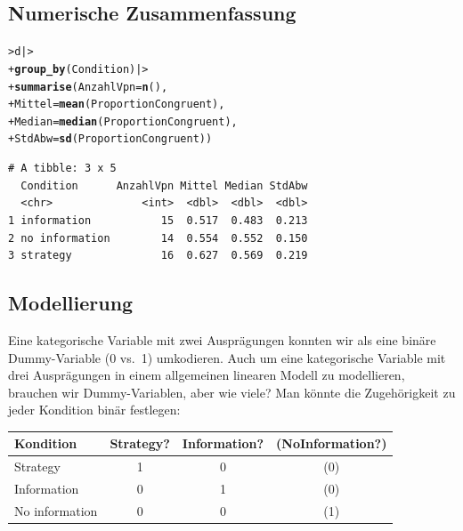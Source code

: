 \documentclass[oneside, 10pt]{book}\usepackage[]{graphicx}\usepackage[]{xcolor}
\makeatletter
\newcommand{\hlstd}[1]{\textcolor[rgb]{0.345,0.345,0.345}{#1}}%
\newcommand{\hlkwc}[1]{\textcolor[rgb]{0.333,0.667,0.333}{#1}}%
\newcommand{\hlkwd}[1]{\textcolor[rgb]{0.737,0.353,0.396}{\textbf{#1}}}%
\newenvironment{kframe}{%
 \def\at@end@of@kframe{}%
 \ifinner\ifhmode%
  \def\at@end@of@kframe{\end{minipage}}%
  \begin{minipage}{\columnwidth}%
 \fi\fi%
 \def\FrameCommand##1{\hskip\@totalleftmargin \hskip-\fboxsep
 \colorbox{shadecolor}{##1}\hskip-\fboxsep
     \hskip-\linewidth \hskip-\@totalleftmargin \hskip\columnwidth}%
 \MakeFramed {\advance\hsize-\width
   \@totalleftmargin\z@ \linewidth\hsize
   \@setminipage}}%
 {\par\unskip\endMakeFramed%
 \at@end@of@kframe}
\newenvironment{knitrout}{}{} %
\makeatother
\begin{document}
\subsection{Numerische Zusammenfassung}

\begin{knitrout}
\color{fgcolor}\begin{kframe}
\begin{alltt}
\hlstd{> }\hlstd{d |>}
\hlstd{+ }  \hlkwd{group_by}\hlstd{(Condition) |>}
\hlstd{+ }  \hlkwd{summarise}\hlstd{(}\hlkwc{AnzahlVpn} \hlstd{=} \hlkwd{n}\hlstd{(),}
\hlstd{+ }            \hlkwc{Mittel} \hlstd{=} \hlkwd{mean}\hlstd{(ProportionCongruent),}
\hlstd{+ }            \hlkwc{Median} \hlstd{=} \hlkwd{median}\hlstd{(ProportionCongruent),}
\hlstd{+ }            \hlkwc{StdAbw} \hlstd{=} \hlkwd{sd}\hlstd{(ProportionCongruent))}
\end{alltt}
\begin{verbatim}
# A tibble: 3 x 5
  Condition      AnzahlVpn Mittel Median StdAbw
  <chr>              <int>  <dbl>  <dbl>  <dbl>
1 information           15  0.517  0.483  0.213
2 no information        14  0.554  0.552  0.150
3 strategy              16  0.627  0.569  0.219
\end{verbatim}
\end{kframe}
\end{knitrout}

\subsection{Modellierung}
Eine kategorische Variable mit zwei Ausprägungen
konnten wir als eine binäre Dummy-Variable (0 vs.\ 1) umkodieren.
Auch um eine kategorische Variable mit drei Ausprägungen
in einem allgemeinen linearen Modell zu modellieren,
brauchen wir Dummy-Variablen, aber wie viele?
Man könnte die Zugehörigkeit zu jeder Kondition
binär festlegen:

\begin{center}
\begin{tabular}{lccc}
\toprule
Kondition      & Strategy? & Information? & (NoInformation?) \\
\midrule
Strategy       & 1         & 0            & (0)              \\
Information    & 0         & 1            & (0)              \\
No information & 0         & 0            & (1)             \\
\bottomrule
\end{tabular}
\end{center}
\end{document}
